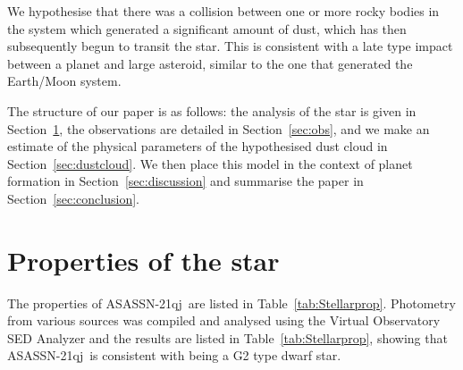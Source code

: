 \documentclass{aa}
\newcommand{\asas}{ASASSN-21qj}
\begin{document}
We hypothesise that there was a collision between one or more rocky bodies in the system which generated a significant amount of dust, which has then subsequently begun to transit the star.
%
This is consistent with a late type impact between a planet and large asteroid, similar to the one that generated the Earth/Moon system.

The structure of our paper is as follows: the analysis of the star is given in Section~\ref{sec:star}, the observations are detailed in Section~\ref{sec:obs}, and we make an estimate of the physical parameters of the hypothesised dust cloud in Section~\ref{sec:dustcloud}.
%
We then place this model in the context of planet formation in Section~\ref{sec:discussion} and summarise the paper in Section~\ref{sec:conclusion}.




\section{Properties of the star}\label{sec:star}

The properties of \asas\ are listed in Table~\ref{tab:Stellarprop}.
%
Photometry from various sources was compiled and analysed using the Virtual Observatory SED Analyzer \citep[VOSA; ][]{Bayo08} and the results are listed in Table~\ref{tab:Stellarprop}, showing that \asas\ is consistent with being a G2 type dwarf star.
\end{document}
